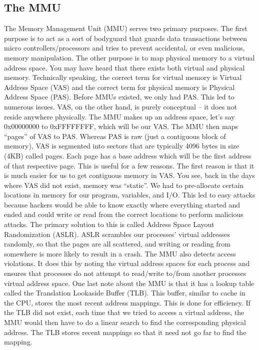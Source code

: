 \documentclass{article}
\begin{document}
\subsection{The MMU}

The Memory Management Unit (MMU) serves two primary purposes. The first purpose is to act as a sort of
bodyguard that guards data transactions between micro controllers/processors and tries to prevent accidental,
or even malicious, memory manipulation. The other purpose is to map physical memory to a virtual address
space. You may have heard that there exists both virtual and physical memory. Technically speaking, the
correct term for virtual memory is Virtual Address Space (VAS) and the correct term for physical memory is
Physical Address Space (PAS). Before MMUs existed, we only had PAS. This led to numerous issues. VAS, on the
other hand, is purely conceptual – it does not reside anywhere physically. The MMU makes up an address space,
let’s say 0x00000000 to 0xFFFFFFFF, which will be our VAS. The MMU then maps “pages” of VAS to PAS. Whereas
PAS is raw (just a contiguous block of memory), VAS is segmented into sectors that are typically 4096 bytes
in size (4KB) called pages. Each page has a base address which will be the first address of that respective
page. This is useful for a few reasons. The first reason is that it is much easier for us to get contiguous
memory in VAS. You see, back in the days where VAS did not exist, memory was “static”. We had to pre-allocate
certain locations in memory for our program, variables, and I/O. This led to easy attacks because hackers
would be able to know exactly where everything started and ended and could write or read from the correct
locations to perform malicious attacks. The primary solution to this is called Address Space Layout
Randomization (ASLR). ASLR scrambles our processes’ virtual addresses randomly, so that the pages are all
scattered, and writing or reading from somewhere is more likely to result in a crash. The MMU also detects
access violations. It does this by noting the virtual address spaces for each process and ensures that
processes do not attempt to read/write to/from another processes virtual address space. One last note about
the MMU is that it has a lookup table called the Translation Lookaside Buffer (TLB). This buffer, similar to
cache in the CPU, stores the most recent address mappings. This is done for efficiency. If the TLB did not
exist, each time that we tried to access a virtual address, the MMU would then have to do a linear search to
find the corresponding physical address. The TLB stores recent mappings so that it need not go far to find
the mapping.
\end{document}
